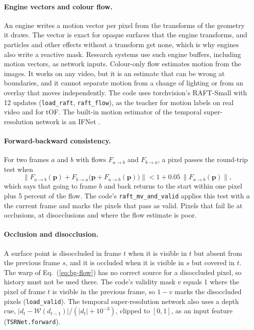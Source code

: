 \paragraph{Engine vectors and colour flow.} An engine writes a motion vector per pixel from the transforms of the geometry it draws. The vector is exact for opaque surfaces that the engine transforms, and particles and other effects without a transform get none, which is why engines also write a reactive mask. Research systems use such engine buffers, including motion vectors, as network inputs.\cite{xiao2020nsrr} Colour-only flow estimates motion from the images. It works on any video, but it is an estimate that can be wrong at boundaries, and it cannot separate motion from a change of lighting or from an overlay that moves independently. The code uses torchvision's RAFT-Small \cite{teed2020raft} with 12 updates (\texttt{load\_raft}, \texttt{raft\_flow}), as the teacher for motion labels on real video and for tOF. The built-in motion estimator of the temporal super-resolution network is an IFNet \cite{huang2022rife}.

\paragraph{Forward-backward consistency.} For two frames $a$ and $b$ with flows $F_{a\to b}$ and $F_{b\to a}$, a pixel passes the round-trip test when
\begin{equation}
\big\|F_{a\to b}(\mathbf p)+F_{b\to a}\big(\mathbf p+F_{a\to b}(\mathbf p)\big)\big\|<1+0.05\,\big\|F_{a\to b}(\mathbf p)\big\|,\label{eq:bg-fb}
\end{equation}
which says that going to frame $b$ and back returns to the start within one pixel plus 5 percent of the flow. The code's \texttt{raft\_mv\_and\_valid} applies this test with $a$ the current frame and marks the pixels that pass as valid. Pixels that fail lie at occlusions, at disocclusions and where the flow estimate is poor.

\paragraph{Occlusion and disocclusion.} A surface point is disoccluded in frame $t$ when it is visible in $t$ but absent from the previous frame $s$, and it is occluded when it is visible in $s$ but covered in $t$. The warp of Eq.~(\ref{eq:bg-flow}) has no correct source for a disoccluded pixel, so history must not be used there. The code's validity mask $v$ equals 1 where the pixel of frame $t$ is visible in the previous frame, so $1-v$ marks the disoccluded pixels (\texttt{load\_valid}). The temporal super-resolution network also uses a depth cue, $|d_t-\mathcal W(d_{t-1})|/(|d_t|+10^{-3})$, clipped to $[0,1]$, as an input feature (\texttt{TSRNet.forward}).

